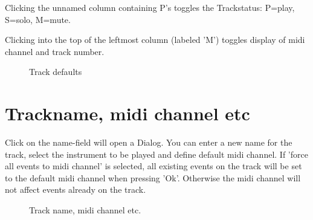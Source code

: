 \documentclass[letterpaper]{report}
\begin{document}
Clicking the unnamed column containing P's toggles the Trackstatus:
P=play, S=solo, M=mute.

Clicking into the top of the leftmost column (labeled 'M') toggles
display of midi channel and track number.

\begin{figure}
\caption{Track defaults}
\end{figure}

\section{Trackname, midi channel etc}\label{trackdlg}

Click on the name-field will open a Dialog. You can enter a new name for
the track, select the instrument to be played and define default midi channel.
If 'force all events to midi channel' is selected, all existing events on
the track will be set to the default midi channel when pressing 'Ok'.
Otherwise the midi channel will not affect events
already on the track.

\begin{figure}
\caption{Track name, midi channel etc.}
\end{figure}
\end{document}
